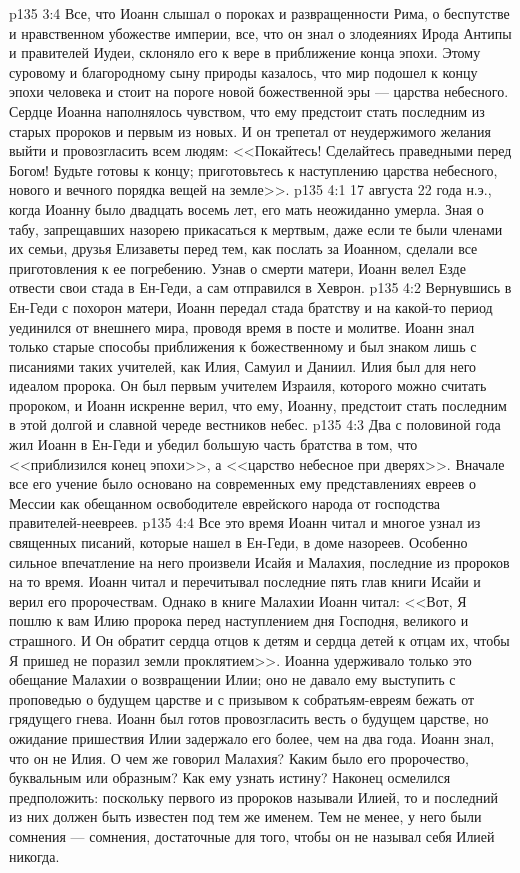 \vs p135 3:4 Все, что Иоанн слышал о пороках и развращенности Рима, о беспутстве и нравственном убожестве империи, все, что он знал о злодеяниях Ирода Антипы и правителей Иудеи, склоняло его к вере в приближение конца эпохи. Этому суровому и благородному сыну природы казалось, что мир подошел к концу эпохи человека и стоит на пороге новой божественной эры --- царства небесного. Сердце Иоанна наполнялось чувством, что ему предстоит стать последним из старых пророков и первым из новых. И он трепетал от неудержимого желания выйти и провозгласить всем людям: <<Покайтесь! Сделайтесь праведными перед Богом! Будьте готовы к концу; приготовьтесь к наступлению царства небесного, нового и вечного порядка вещей на земле>>.
\vs p135 4:1 17 августа 22 года н.э., когда Иоанну было двадцать восемь лет, его мать неожиданно умерла. Зная о табу, запрещавших назорею прикасаться к мертвым, даже если те были членами их семьи, друзья Елизаветы перед тем, как послать за Иоанном, сделали все приготовления к ее погребению. Узнав о смерти матери, Иоанн велел Езде отвести свои стада в Ен\hyp{}Геди, а сам отправился в Хеврон.
\vs p135 4:2 Вернувшись в Ен\hyp{}Геди с похорон матери, Иоанн передал стада братству и на какой\hyp{}то период уединился от внешнего мира, проводя время в посте и молитве. Иоанн знал только старые способы приближения к божественному и был знаком лишь с писаниями таких учителей, как Илия, Самуил и Даниил. Илия был для него идеалом пророка. Он был первым учителем Израиля, которого можно считать пророком, и Иоанн искренне верил, что ему, Иоанну, предстоит стать последним в этой долгой и славной череде вестников небес.
\vs p135 4:3 Два с половиной года жил Иоанн в Ен\hyp{}Геди и убедил большую часть братства в том, что <<приблизился конец эпохи>>, а <<царство небесное при дверях>>. Вначале все его учение было основано на современных ему представлениях евреев о Мессии как обещанном освободителе еврейского народа от господства правителей\hyp{}неевреев.
\vs p135 4:4 Все это время Иоанн читал и многое узнал из священных писаний, которые нашел в Ен\hyp{}Геди, в доме назореев. Особенно сильное впечатление на него произвели Исайя и Малахия, последние из пророков на то время. Иоанн читал и перечитывал последние пять глав книги Исайи и верил его пророчествам. Однако в книге Малахии Иоанн читал: <<Вот, Я пошлю к вам Илию пророка перед наступлением дня Господня, великого и страшного. И Он обратит сердца отцов к детям и сердца детей к отцам их, чтобы Я пришед не поразил земли проклятием>>. Иоанна удерживало только это обещание Малахии о возвращении Илии; оно не давало ему выступить с проповедью о будущем царстве и с призывом к собратьям\hyp{}евреям бежать от грядущего гнева. Иоанн был готов провозгласить весть о будущем царстве, но ожидание пришествия Илии задержало его более, чем на два года. Иоанн знал, что он не Илия. О чем же говорил Малахия? Каким было его пророчество, буквальным или образным? Как ему узнать истину? Наконец осмелился предположить: поскольку первого из пророков называли Илией, то и последний из них должен быть известен под тем же именем. Тем не менее, у него были сомнения --- сомнения, достаточные для того, чтобы он не называл себя Илией никогда.
